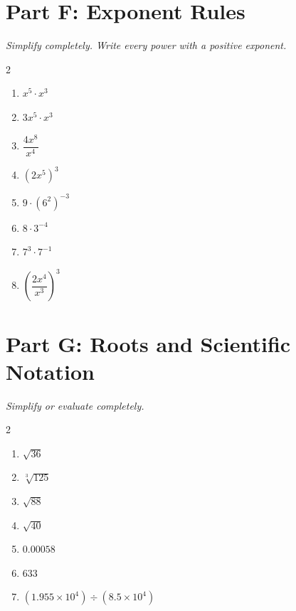 \documentclass[11pt]{article}
\begin{document}
\section*{Part F: Exponent Rules}
\noindent\textit{Simplify completely. Write every power with a positive exponent.}
\begin{multicols}{2}
\begin{enumerate}
  \item $x^{5} \cdot x^{3}$
  \vspace{1.2cm}
  \item $3x^{5} \cdot x^{3}$
  \vspace{1.2cm}
  \item $\dfrac{4x^{8}}{x^{4}}$
  \vspace{1.2cm}
  \item $(2x^{5})^{3}$
  \vspace{1.2cm}
  \item $9 \cdot (6^{2})^{-3}$
  \vspace{1.2cm}
  \item $8 \cdot 3^{-4}$
  \vspace{1.2cm}
  \item $7^{3} \cdot 7^{-1}$
  \vspace{1.2cm}
  \item $\left(\dfrac{2x^{4}}{x^{3}}\right)^{3}$
  \vspace{1.2cm}
\end{enumerate}
\end{multicols}

\section*{Part G: Roots and Scientific Notation}
\noindent\textit{Simplify or evaluate completely.}
\begin{multicols}{2}
\begin{enumerate}
  \item $\sqrt{36}$
  \vspace{1.2cm}
  \item $\sqrt[3]{125}$
  \vspace{1.2cm}
  \item $\sqrt{88}$
  \vspace{1.2cm}
  \item $\sqrt{40}$
  \vspace{1.2cm}
  \item $0.00058$
  \vspace{1.2cm}
  \item $633$
  \vspace{1.2cm}
  \item $(1.955 \times 10^{4}) \div (8.5 \times 10^{4})$
  \vspace{1.2cm}
\end{enumerate}
\end{multicols}
\end{document}
